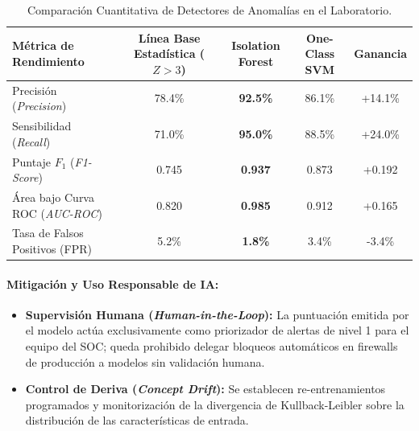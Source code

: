 \documentclass[11pt,letterpaper]{article}
\begin{document}
\begin{table}[H]
    \centering
    \small
    \begin{tabular}{@{}lcccc@{}}
        \toprule
        \textbf{Métrica de Rendimiento} & \textbf{Línea Base Estadística ($Z>3$)} & \textbf{Isolation Forest} & \textbf{One-Class SVM} & \textbf{Ganancia} \\
        \midrule
        Precisión (\textit{Precision}) & 78.4\% & \textbf{92.5\%} & 86.1\% & +14.1\% \\
        Sensibilidad (\textit{Recall}) & 71.0\% & \textbf{95.0\%} & 88.5\% & +24.0\% \\
        Puntaje $F_1$ (\textit{F1-Score}) & 0.745 & \textbf{0.937} & 0.873 & +0.192 \\
        Área bajo Curva ROC (\textit{AUC-ROC}) & 0.820 & \textbf{0.985} & 0.912 & +0.165 \\
        Tasa de Falsos Positivos (FPR) & 5.2\% & \textbf{1.8\%} & 3.4\% & -3.4\% \\
        \bottomrule
    \end{tabular}
    \caption{Comparación Cuantitativa de Detectores de Anomalías en el Laboratorio.}
\end{table}

\paragraph{Mitigación y Uso Responsable de IA:}
\begin{itemize}
    \item \textbf{Supervisión Humana (\textit{Human-in-the-Loop}):} La puntuación emitida por el modelo actúa exclusivamente como priorizador de alertas de nivel 1 para el equipo del SOC; queda prohibido delegar bloqueos automáticos en firewalls de producción a modelos sin validación humana.
    \item \textbf{Control de Deriva (\textit{Concept Drift}):} Se establecen re-entrenamientos programados y monitorización de la divergencia de Kullback-Leibler sobre la distribución de las características de entrada.
\end{itemize}
\end{document}
